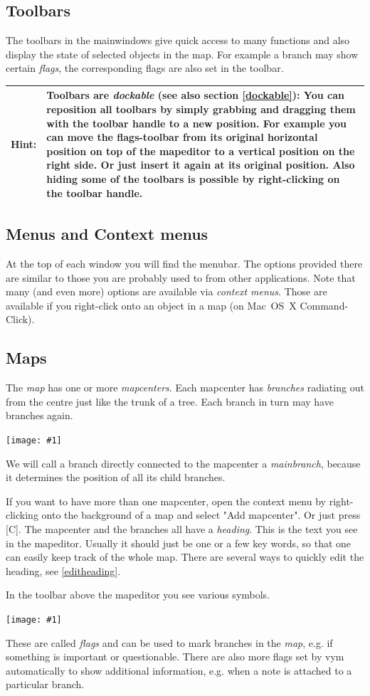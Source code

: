 \documentclass[12pt,a4paper]{article}
\newcommand{\maximage}[1]{  
    \begin{center}
        \texttt{[image: \#1]} 
    \end{center}
}
\newcommand{\hint}[1]{
    \begin{center} 
        \begin{tabular}{|rp{12cm}|} \hline
            {\bf Hint}:& #1\\   \hline
        \end{tabular}
            \marginpar{\Huge !} 
    \end{center} 
}
\newcommand{\vym}{{\sc vym }}
\newcommand{\key}[1]{[#1]}
\begin{document}
\subsection{Toolbars}
The toolbars in the mainwindows give quick access to many functions and
also display the state of selected objects in the map. For example a
branch may show certain {\em flags}, the corresponding flags are also
set in the toolbar. 

\hint {Toolbars are {\em dockable} (see also section \ref{dockable}):
You can reposition all toolbars by simply grabbing and dragging them
with the toolbar handle to a new position. For example you can move the
flags-toolbar from its original horizontal position on top of the
mapeditor to a vertical position on the right side.  Or just insert it
again at its original position. Also hiding some of the toolbars is
possible by right-clicking on the toolbar handle.}

\subsection{Menus and Context menus}
At the top of each window you will find the menubar. The options
provided there are similar to those you are probably used to from other
applications. Note that many (and even more) options are available via
{\em context menus}. Those are available if you right-click onto an
object in a map (on Mac~OS~X Command-Click).

\subsection{Maps}
The  {\em map} has one or more {\em mapcenters}.  Each mapcenter has
{\em branches} radiating out from the centre just like the trunk of a
tree. Each branch in turn may have branches again.
\maximage{images/branches.png} 
We will call a branch directly connected to the mapcenter a {\em
mainbranch}, because it determines the position of all its child
branches.

If you want to have more than one mapcenter, open the context menu by
right-clicking onto the background of a map and select "Add mapcenter".
Or just press \key{C}.
The mapcenter and the branches all have a {\em heading}. This is the
text you see in the mapeditor. Usually it should just be one or a few
key words, so that one can easily keep track of the whole map.
There are several ways to quickly edit the heading, see
\ref{editheading}.


In the toolbar above the mapeditor you see various symbols.
    \maximage{images/default-flags.png}
These are called {\em flags} and can be used to mark branches in the
{\em map}, e.g. if something is important or questionable.  There are
also more flags set by \vym automatically to show additional
information, e.g. when a note is attached to a  particular branch.
\end{document}
